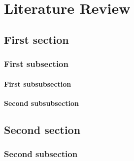 \chapter{Literature Review}

\section{First section}
    

\subsection{First subsection}
    

\subsubsection{First subsubsection}
    

\subsubsection{Second subsubsection}
    

\section{Second section}
    

\subsection{Second subsection}
    

